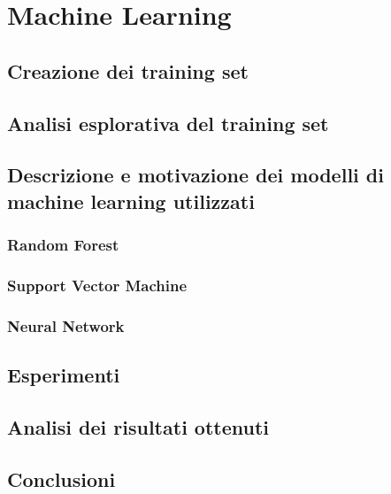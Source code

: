 \setcounter{chapter}{0}
\part{Machine Learning}
\chapter{Creazione dei training set}

\chapter{Analisi esplorativa del training set}

\chapter{Descrizione e motivazione dei modelli di machine learning utilizzati}
\section{Random Forest}
\section{Support Vector Machine}
\section{Neural Network}

\chapter{Esperimenti}

\chapter{Analisi dei risultati ottenuti}

\chapter{Conclusioni}

